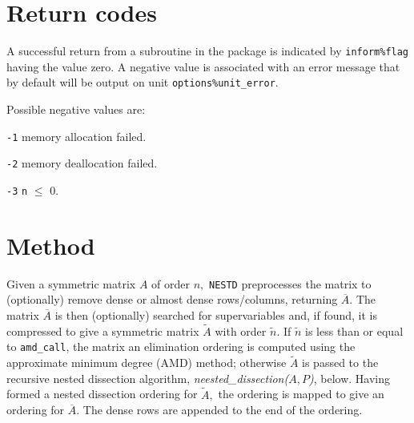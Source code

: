 
\section{Return codes} \label{nestd:errors}

A successful return from a subroutine in the package is indicated by
{\tt inform\%flag} having the value zero.
A negative value is associated with an error message that by default will
be output on unit {\tt options\%unit\_error}.

Possible negative values are:

\begin{description}

\item{} {\tt -1} memory allocation failed.
\item{} {\tt -2} memory deallocation failed.
\item{} {\tt -3} {\tt n} $\le$ 0.
\end{description}


\section{Method} \label{method}

Given a symmetric matrix $A$ of order $n,$ {\tt NESTD} preprocesses 
the matrix to (optionally) remove dense or almost dense rows/columns, returning 
$\overline{A}.$ The matrix $\overline{A}$ is then (optionally) searched for 
supervariables and, if found, it is compressed to give a symmetric matrix 
$\widetilde{A}$ with order $\tilde{n}.$ If $\tilde{n}$ is less than or equal to 
{\tt amd\_call}, the matrix an elimination ordering is computed using the 
approximate minimum degree (AMD) method; otherwise $\widetilde{A}$ is passed to the 
recursive nested dissection algorithm, \textit{neested\_dissection($A,P$)}, below. Having formed a 
nested dissection ordering for $\widetilde{A},$ the 
ordering is mapped to give an ordering for $\overline{A}.$ The dense rows are 
appended to the end of the ordering. 

